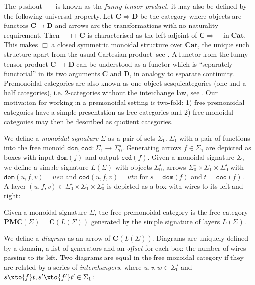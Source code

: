 The pushout $\Box$ is known as the \emph{funny tensor product}, it may also be defined
by the following universal property. Let $\mathbf{C} \Rightarrow \mathbf{D}$ be the
category where objects are functors $\mathbf{C} \to \mathbf{D}$ and arrows are the
transformations with no naturality requirement. Then $-\ \Box\ \mathbf{C}$
is characterised as the left adjoint of $\mathbf{C} \Rightarrow -$ in $\mathbf{Cat}$.
This makes $\Box$ a closed symmetric monoidal structure over $\mathbf{Cat}$, the
unique such structure apart from the usual Cartesian product, see
\cite{FoltzEtAl80}. A functor from the funny tensor product
$\mathbf{C}\ \Box\ \mathbf{D}$ can be understood as a functor which is ``separately
functorial'' in its two arguments $\mathbf{C}$ and $\mathbf{D}$, in analogy to separate continuity.
Premonoidal categories are also known as one-object sesquicategories
(one-and-a-half categories), i.e. 2-categories without the interchange law,
see \cite{Street96}.
Our motivation for working in a premonoidal setting is two-fold: 1) free
premonoidal categories have a simple presentation as free categories and 2)
free monoidal categories may then be described as quotient categories.

We define a \emph{monoidal signature} $\Sigma$ as a pair of sets $\Sigma_0, \Sigma_1$ with a pair of functions into the free monoid $\mathtt{dom}, \mathtt{cod} : \Sigma_1 \to \Sigma_0^\star$.
Generating arrows $f \in \Sigma_1$ are depicted as boxes with input $\mathtt{dom}(f)$ and output $\mathtt{cod}(f)$.
Given a monoidal signature $\Sigma$, we define a simple signature $L(\Sigma)$ with objects $\Sigma_0^\star$, arrows $\Sigma_0^\star \times \Sigma_1 \times \Sigma_0^\star$ with $\mathtt{dom}(u, f, v) = usv$
and $\mathtt{cod}(u, f, v) = utv$ for $s = \mathtt{dom}(f)$ and $t = \mathtt{cod}(f)$.
A layer $(u, f, v) \in \Sigma_0^\star \times \Sigma_1 \times \Sigma_0^\star$ is depicted as a box with wires to its left and right:

\begin{center}

\end{center}

\begin{proposition}
Given a monoidal signature $\Sigma$, the free premonoidal category is the free category $\mathbf{PMC}(\Sigma) = \mathbf{C}(L(\Sigma))$ generated by the simple signature of layers $L(\Sigma)$.
\end{proposition}

We define a \emph{diagram} as an arrow of $\mathbf{C}(L(\Sigma))$.
Diagrams are uniquely defined by a domain, a list of generators and an \emph{offset} for each box: the number of wires passing to its left.
Two diagrams are equal in the free monoidal category if they are related by a series of \emph{interchangers},
where $u, v, w \in \Sigma_0^\star$ and $s \xto{f} t, s' \xto{f'} t' \in \Sigma_1$:

